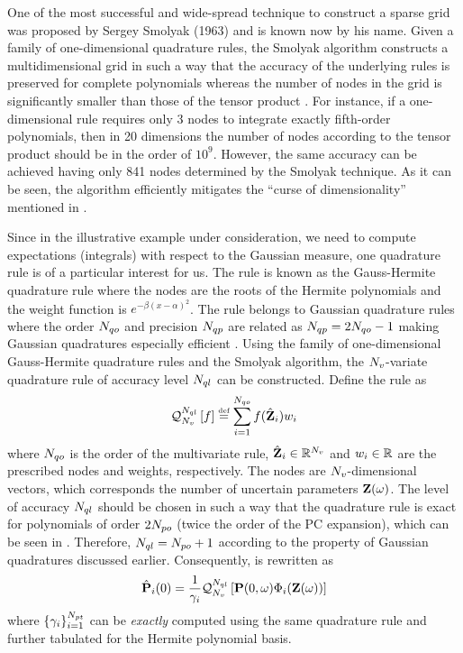 One of the most successful and wide-spread technique to construct a sparse grid was proposed by Sergey Smolyak (1963) and is known now by his name. Given a family of one-dimensional quadrature rules, the Smolyak algorithm constructs a multidimensional grid in such a way that the accuracy of the underlying rules is preserved for complete polynomials whereas the number of nodes in the grid is significantly smaller than those of the tensor product \cite{heiss2008, eldred2009}. For instance, if a one-dimensional rule requires only 3 nodes to integrate exactly fifth-order polynomials, then in 20 dimensions the number of nodes according to the tensor product should be in the order of $10^9$. However, the same accuracy can be achieved having only 841 nodes determined by the Smolyak technique. As it can be seen, the algorithm efficiently mitigates the ``curse of dimensionality'' mentioned in .

Since in the illustrative example under consideration, we need to compute expectations (integrals) with respect to the Gaussian measure, one quadrature rule is of a particular interest for us. The rule is known as the Gauss-Hermite quadrature rule where the nodes are the roots of the Hermite polynomials and the weight function is $e^{-\beta (x - \alpha)^2}$. The rule belongs to Gaussian quadrature rules where the order $N_{qo}$ and precision $N_{qp}$ are related as $N_{qp} = 2 N_{qo} - 1$ making Gaussian quadratures especially efficient \cite{heiss2008}. Using the family of one-dimensional Gauss-Hermite quadrature rules and the Smolyak algorithm, the ${N_v}$-variate quadrature rule of accuracy level $N_{ql}$ can be constructed. Define the rule as
\[
  \mathcal{Q}_{{N_v}}^{N_{ql}}\left[f\right] \stackrel{\text{\tiny def}}{=} \sum_{i = 1}^{N_{qo}} f(\hat{\mathbf{Z}}_i) w_i
\]
where $N_{qo}$ is the order of the multivariate rule, $\hat{\mathbf{Z}}_i \in \mathbb{R}^{N_v}$ and $w_i \in \mathbb{R}$ are the prescribed nodes and weights, respectively. The nodes are ${N_v}$-dimensional vectors, which corresponds the number of uncertain parameters $\mathbf{Z}(\omega)$. The level of accuracy $N_{ql}$ should be chosen in such a way that the quadrature rule is exact for polynomials of order $2 {N_{po}}$ (twice the order of the PC expansion), which can be seen in . Therefore, $N_{ql} = {N_{po}} + 1$ according to the property of Gaussian quadratures discussed earlier. Consequently,  is rewritten as
\[
  \hat{\mathbf{P}}_i(0) = \frac{1}{\gamma_i} \mathcal{Q}_{{N_v}}^{N_{ql}}\left[\mathbf{P}(0, \omega) \Phi_i(\mathbf{Z}(\omega))\right]
\]
where $\{ \gamma_i \}_{i = 1}^{{N_{pt}}}$ can be \emph{exactly} computed using the same quadrature rule and further tabulated for the Hermite polynomial basis.
